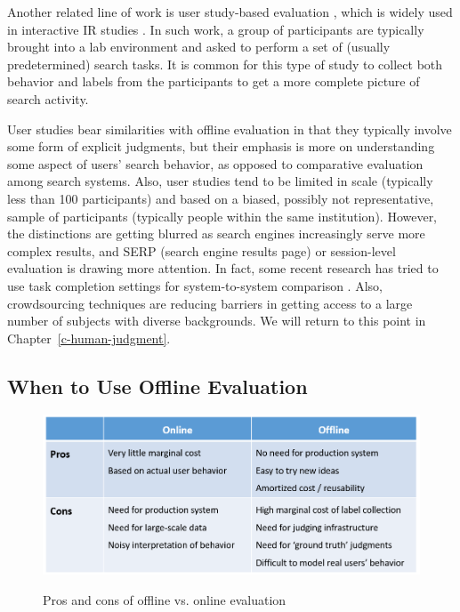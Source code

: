 Another related line of work is user study-based evaluation \citep{Bron:2013, Liu:2014, Shah:2011}, which is widely used in interactive IR studies \citep{kelly2009methods}. In such work, a group of participants are typically brought into a lab environment and asked to perform a set of (usually predetermined) search tasks. It is common for this type of study to collect both behavior and labels from the participants to get a more complete picture of search activity. 

User studies bear similarities with offline evaluation in that they typically involve some form of explicit judgments, but their emphasis is more on understanding some aspect of users' search behavior, as opposed to comparative evaluation among search systems. Also, user studies tend to be limited in scale (typically less than 100 participants) and based on a biased, possibly not representative, sample of participants (typically people within the same institution).
However, the distinctions are getting blurred as search engines increasingly serve more complex results, and SERP (search engine results page) or session-level evaluation is drawing more attention. In fact, some recent research has tried to use task completion settings for system-to-system comparison \citep{Xu:2009}. Also, crowdsourcing techniques are reducing barriers in getting access to a large number of subjects with diverse backgrounds. We will return to this point in Chapter~\ref{c-human-judgment}.

\subsection{When to Use Offline Evaluation}

\begin{figure}
	\centering
	{
	\includegraphics[width=1\textwidth]{images/online_vs_offline}
	}\vspace*{3em}
	\caption{Pros and cons of offline vs. online evaluation}
\label{onlinevsoffline}
\end{figure}

